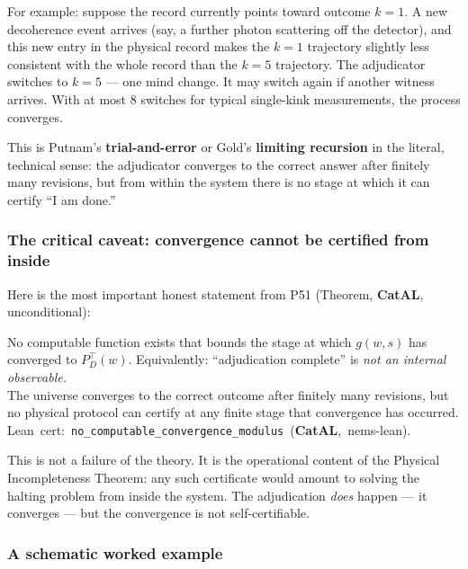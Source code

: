 \documentclass[11pt,a4paper]{article}
\newcommand{\term}[1]{\textbf{#1}}
\newcommand{\lean}[1]{\texttt{#1}}
\newcommand{\CatAL}{\textbf{CatAL}}
\begin{document}
For example: suppose the record currently points toward outcome $k=1$.  A new
decoherence event arrives (say, a further photon scattering off the detector), and
this new entry in the physical record makes the $k=1$ trajectory slightly less
consistent with the whole record than the $k=5$ trajectory.  The adjudicator switches
to $k=5$ --- one mind change.  It may switch again if another witness arrives.  With
at most 8 switches for typical single-kink measurements, the process converges.

This is Putnam's \term{trial-and-error} or Gold's \term{limiting recursion} in the
literal, technical sense: the adjudicator converges to the correct answer after
finitely many revisions, but from within the system there is no stage at which it can
certify ``I am done.''

\subsubsection*{The critical caveat: convergence cannot be certified from inside}

Here is the most important honest statement from P51 (Theorem, \CatAL, unconditional):

\begin{tcolorbox}[colback=boxred,colframe=red!50!black,title=No computable convergence modulus]
No computable function exists that bounds the stage at which $g(w,s)$ has converged
to $P^\top_D(w)$.  Equivalently: ``adjudication complete'' is \emph{not an internal
observable.}\\[4pt]
The universe converges to the correct outcome after finitely many revisions, but no
physical protocol can certify at any finite stage that convergence has occurred.\\[4pt]
\mbox{Lean cert: \lean{no\_computable\_convergence\_modulus} (\CatAL, nems-lean).}
\end{tcolorbox}

\noindent
This is not a failure of the theory.  It is the operational content of the Physical
Incompleteness Theorem: any such certificate would amount to solving the halting
problem from inside the system.  The adjudication \emph{does} happen --- it converges
--- but the convergence is not self-certifiable.

\subsubsection*{A schematic worked example}
\end{document}
